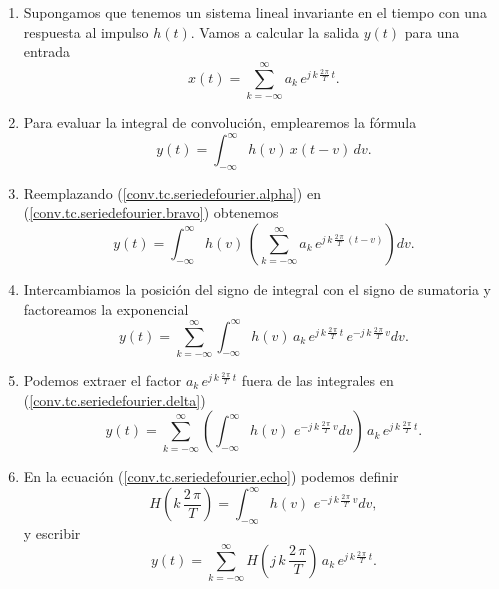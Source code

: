 \begin{enumerate}
\item Supongamos que tenemos un sistema lineal invariante en el tiempo con una respuesta al impulso $h(t)$. Vamos a calcular la salida $y(t)$ para una entrada
\begin{equation}
	x(t) = \sum_{k=-\infty}^{\infty} a_{k} \, e^{j \, k \, \frac{2 \, \pi}{T} \, t}. 
	\label{conv.tc.seriedefourier.alpha}
\end{equation}

\item Para evaluar la integral de convolución, emplearemos la fórmula
\begin{equation}
	y(t) = \int_{-\infty}^{\infty} h(v) \, x(t - v) \, dv. 
	\label{conv.tc.seriedefourier.bravo}	
\end{equation}

\item Reemplazando (\ref{conv.tc.seriedefourier.alpha}) en (\ref{conv.tc.seriedefourier.bravo}) obtenemos
\begin{equation}
	y(t) = \int_{-\infty}^{\infty} h(v) \, \left(
	\sum_{k=-\infty}^{\infty} a_{k} \, e^{j \, k \, \frac{2 \, \pi}{T} \, (t-v)}
	\right)
	dv. 
	\label{conv.tc.seriedefourier.charlie}	
\end{equation}
\item Intercambiamos la posición del signo de integral con el signo de sumatoria
y factoreamos la exponencial
\begin{equation}
	y(t) = \sum_{k=-\infty}^{\infty} 
	\int_{-\infty}^{\infty} h(v) \, 
	 a_{k} \, e^{j \, k \, \frac{2 \, \pi}{T} \, t} \, e^{-j \, k \, \frac{2 \, \pi}{T} \, v}
	dv. 
	\label{conv.tc.seriedefourier.delta}	
\end{equation}
\item Podemos extraer el factor $a_{k} \, e^{j \, k \, \frac{2 \, \pi}{T} \, t}$ fuera de las integrales en (\ref{conv.tc.seriedefourier.delta})
\begin{equation}
	y(t) = \sum_{k=-\infty}^{\infty} 
	\left(\int_{-\infty}^{\infty} h(v) \, 
	 \, e^{-j \, k \, \frac{2 \, \pi}{T} \, v}
	dv\right) \, a_{k} \, e^{j \, k \, \frac{2 \, \pi}{T} \, t}.
	\label{conv.tc.seriedefourier.echo}	
\end{equation}
\item En la ecuación (\ref{conv.tc.seriedefourier.echo}) podemos definir
\begin{equation}
	H(k \, \frac{2 \, \pi}{T}) = \int_{-\infty}^{\infty} h(v) \, 
	\, e^{-j \, k \, \frac{2 \, \pi}{T} \, v}
	dv,
\end{equation}
y escribir
\begin{equation}
	y(t) = \sum_{k=-\infty}^{\infty} 
	 H(j \, k \, \frac{2 \, \pi}{T}) \, a_{k} \, e^{j \, k \, \frac{2 \, \pi}{T} \, t}.
	\label{conv.tc.seriedefourier.foxtrot}	
\end{equation}


\end{enumerate}
